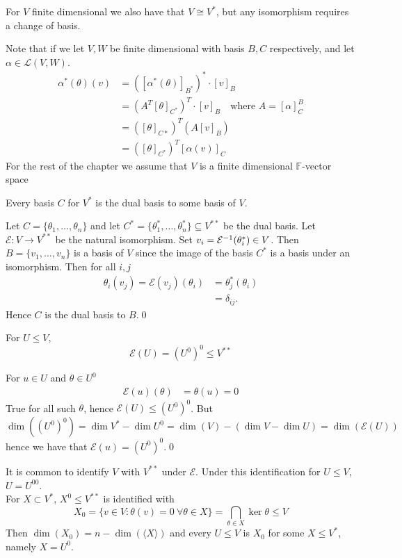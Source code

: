 \documentclass{article}
\newcommand{\F}{\mathbb{F}}
\begin{document}
	\begin{remark}
	  For $ V $ finite dimensional we also have that $ V\cong V^* $, but any isomorphism requires a change of basis.
	\end{remark}
Note that if we let $ V,W $ be finite dimensional with basis $ B,C $ respectively, and let $ \alpha\in\mathcal L(V,W) $.
\begin{align*}
	\alpha^*(\theta)(v)&=\left([\alpha^*(\theta)]_{B^*}\right)^*\cdot[v]_B\\
			   &=(A^T[\theta]_{C^*})^T\cdot[v]_B\quad \text{where } A=[\alpha]^B_C\\
			   &= ([\theta]_{C*})^T(A[v]_B)\\
			   &= ([\theta]_{C^*})^T[\alpha(v)]_C
\end{align*}
For the rest of the chapter we assume that $ V $ is a finite dimensional $ \F $-vector space
\begin{proposition}
  Every basis $ C $ for $ V^* $ is the dual basis to some basis of $ V $.
\end{proposition}
\pf Let $ C=\{\theta_1,\dots, \theta_n\} $ and let $ C^*=\{\theta_1^*,\dots, \theta_n^*\} \subseteq V^{**}$ be the dual basis. Let $ \mathcal E:V\to V^{**} $ be the natural isomorphism. Set $ v_i={\mathcal E}^{-1}(\theta_i^*)\in V $. Then $ B=\{v_1,\dots, v_n\} $ is a basis of $ V $ since the image of the basis $ C^* $ is a basis under an isomorphism. Then for all $ i,j $
\begin{align*}
	\theta_i(v_j)=\mathcal E(v_j)(\theta_i)&=\theta_j^*(\theta_i)\\
					       &=\delta_{ij}.
\end{align*}
Hence $ C $ is the dual basis to $ B $.\qed
\begin{proposition}
  For $ U\le V $,
  \[
	  \mathcal E(U)=(U^0)^0\le V^{**}
  \]
\end{proposition}
\pf For $ u\in U $ and $ \theta\in U^0 $
\begin{align*}
	\mathcal E(u)(\theta) &= \theta(u)=0
\end{align*}
True for all such $ \theta $, hence $ \mathcal E(U)\le (U^0)^0 $. But $ \dim((U^0)^0)=\dim V^*-\dim U^0=\dim(V)-(\dim V-\dim U)=\dim(\mathcal E(U)) $ hence we have that $ \mathcal E(u)=(U^0)^0 $.\qed
\begin{remark}
	It is common to identify $ V $ with $ V^{**} $ under $ \mathcal E $. Under this identification for $ U\le V $, $ U=U^{00} $.\\
	For $ X\subset V^* $, $ X^0\le V^{**} $ is identified with 
	\[
		X_0=\{v\in V:\theta(v)=0\ \forall \theta\in X\}=\bigcap_{\theta\in X}\ker\theta\le V
	\]
	Then $ \dim(X_0)=n-\dim(\langle X\rangle) $ and every $ U\le V $ is $ X_0 $ for some $ X\le V^* $, namely $ X=U^0 $.
\end{remark}
\end{document}
